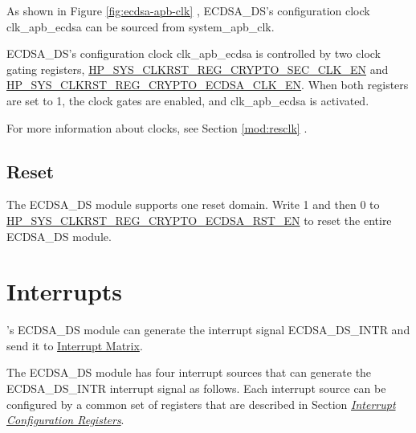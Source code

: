 \documentclass[main\_\_EN.tex]{subfiles}
\begin{document}
As shown in Figure \ref{fig:ecdsa-apb-clk} \textit{}, ECDSA\_DS's configuration clock clk\_apb\_ecdsa can be sourced from system\_apb\_clk.

ECDSA\_DS's configuration clock clk\_apb\_ecdsa is controlled by two clock gating registers, \hyperref[fielddesc:HPSYSCLKRSTREGCRYPTOSECCLKEN]{HP\_SYS\_CLKRST\_REG\_CRYPTO\_SEC\_CLK\_EN} and \hyperref[fielddesc:HPSYSCLKRSTREGCRYPTOECDSACLKEN]{HP\_SYS\_CLKRST\_REG\_CRYPTO\_ECDSA\_CLK\_EN}. When both registers are set to 1, the clock gates are enabled, and clk\_apb\_ecdsa is activated.

For more information about clocks, see Section \ref{mod:resclk} \textit{}.

\subsection{Reset}

The ECDSA\_DS module supports one reset domain. Write 1 and then 0 to \hyperref[fielddesc:HPSYSCLKRSTREGCRYPTOECDSARSTEN]{HP\_SYS\_CLKRST\_REG\_CRYPTO\_ECDSA\_RST\_EN} to reset the entire ECDSA\_DS module.

\section{Interrupts}
\label{sec:ecdsa-interrupt}

\chipname{}'s ECDSA\_DS module can generate the interrupt signal ECDSA\_DS\_INTR and send it to \hyperref[mod:intmtrx]{Interrupt Matrix}.

The ECDSA\_DS module has four interrupt sources that can generate the ECDSA\_DS\_INTR interrupt signal as follows. Each interrupt source can be configured by a common set of registers that are described in Section \hyperref[interrupt-config-registers]{\textit{Interrupt Configuration Registers}}.
\end{document}
